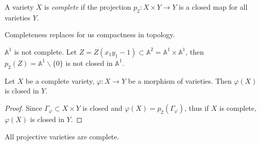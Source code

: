 \begin{definition}
	A variety $X$  is \textit{complete} if the projection $ p_2:X\times Y\to Y $ is a closed map for all varieties $ Y $.
\end{definition}
\begin{remark}
	Completeness replaces for us compactness in topology.
\end{remark}
\begin{example}
	$ \mathbb{A}^1 $ is not complete. Let $ Z=Z(x_1y_1-1)\subset \mathbb{A}^2=\mathbb{A}^1\times \mathbb{A}^1 $, then $ p_2(Z)=\mathbb{A}^1\backslash\{ 0 \} $ is not closed in $ \mathbb{A}^1 $.
\end{example}
\begin{proposition}
	Let $ X $ be a complete variety, $ \varphi:X\to Y $ be a morphism of varieties. Then $ \varphi(X) $ is closed in $ Y $.
\end{proposition}
\begin{proof}
	Since $ \Gamma_\varphi\subset X\times Y $ is closed and $ \varphi(X)=p_2(\Gamma_\varphi) $, thus if $ X $ is complete, $ \varphi(X) $ is closed in $ Y $.
\end{proof}
\begin{theorem}
	All projective varieties are complete.
\end{theorem}

